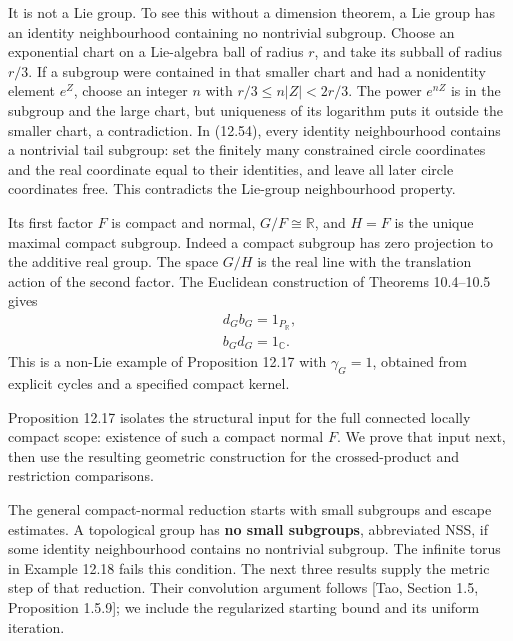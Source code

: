 \documentclass[
  11pt,
]{article}
\begin{document}
It is not a Lie group. To see this without a dimension theorem, a Lie
group has an identity neighbourhood containing no nontrivial subgroup.
Choose an exponential chart on a Lie-algebra ball of radius \(r\), and
take its subball of radius \(r/3\). If a subgroup were contained in that
smaller chart and had a nonidentity element \(e^Z\), choose an integer
\(n\) with \(r/3\leq n|Z|<2r/3\). The power \(e^{nZ}\) is in the
subgroup and the large chart, but uniqueness of its logarithm puts it
outside the smaller chart, a contradiction. In (12.54), every identity
neighbourhood contains a nontrivial tail subgroup: set the finitely many
constrained circle coordinates and the real coordinate equal to their
identities, and leave all later circle coordinates free. This
contradicts the Lie-group neighbourhood property.

Its first factor \(F\) is compact and normal, \(G/F\cong\mathbb R\), and
\(H=F\) is the unique maximal compact subgroup. Indeed a compact
subgroup has zero projection to the additive real group. The space
\(G/H\) is the real line with the translation action of the second
factor. The Euclidean construction of Theorems 10.4--10.5 gives \[
\begin{gathered}
d_Gb_G=1_{P_{\mathbb R}},\\
b_Gd_G=1_{\mathbb C}.
\end{gathered}
\tag{12.55}
\] This is a non-Lie example of Proposition 12.17 with \(\gamma_G=1\),
obtained from explicit cycles and a specified compact kernel.

Proposition 12.17 isolates the structural input for the full connected
locally compact scope: existence of such a compact normal \(F\). We
prove that input next, then use the resulting geometric construction for
the crossed-product and restriction comparisons.

The general compact-normal reduction starts with small subgroups and
escape estimates. A topological group has \textbf{no small subgroups},
abbreviated NSS, if some identity neighbourhood contains no nontrivial
subgroup. The infinite torus in Example 12.18 fails this condition. The
next three results supply the metric step of that reduction. Their
convolution argument follows {[}Tao, Section 1.5, Proposition 1.5.9{]};
we include the regularized starting bound and its uniform iteration.
\end{document}
